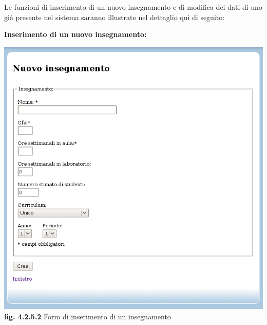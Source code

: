 \documentclass[11pt,a4paper]{article}
\begin{document}
Le funzioni di inserimento di un nuovo insegnamento e di modifica dei dati di uno già presente nel sistema saranno illustrate nel dettaglio qui di seguito:
\newline \newline
\begin{large}\textbf{Inserimento di un nuovo insegnamento:}\end{large}

\bigskip
\begin{center}
	\includegraphics[scale=0.5]{images/nuovo_insegnamento.jpg}\\
	\textbf{fig. 4.2.5.2} Form di inserimento di un insegnamento\\
\end{center}
\bigskip
\end{document}
